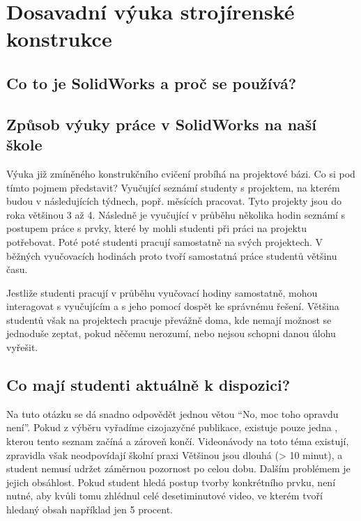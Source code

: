 \chapter{Dosavadní výuka strojírenské konstrukce}
\fxnote[inline=true]{\textcolor{mygreen}{Tato sekce je ještě částečně rozpracovaná, možná ji ještě přeformuluji celou}}

\section{Co to je SolidWorks a proč se používá?}

\section{Způsob výuky práce v SolidWorks na naší škole}
    Výuka již zmíněného konstrukčního cvičení probíhá na projektové bázi.
    Co si pod tímto pojmem představit?
    Vyučující seznámí studenty s projektem, na kterém budou v následujících týdnech, popř. měsících pracovat. 
    Tyto projekty jsou do roka většinou 3 až 4.
    Následně je vyučující v průběhu několika hodin seznámí s postupem práce s prvky, které by mohli studenti při práci na projektu potřebovat.
    Poté poté studenti pracují samostatně na svých projektech.
    V běžných vyučovacích hodinách proto tvoří samostatná práce studentů většinu času.

    Jestliže studenti pracují v průběhu vyučovací hodiny samostatně, mohou interagovat s vyučujícím a s jeho pomocí dospět ke správnému řešení.
    Většina studentů však na projektech pracuje převážně doma, kde nemají možnost se jednoduše zeptat, pokud něčemu nerozumí, nebo nejsou schopni danou úlohu vyřešit.

\section{Co mají studenti aktuálně k dispozici?}
    Na tuto otázku se dá snadno odpovědět jednou větou \enquote{No, moc toho opravdu není}.
    Pokud z výběru vyřadíme cizojazyčné publikace, existuje pouze jedna , kterou tento seznam začíná a zároveň končí. 
    Videonávody na toto téma existují, zpravidla však neodpovídají školní praxi
    Většinou jsou dlouhá (> 10 minut), a student nemusí udržet záměrnou pozornost po celou dobu.
    Dalším problémem je jejich obsáhlost.
    Pokud student hledá postup tvorby konkrétního prvku, není nutné, aby kvůli tomu zhlédnul celé desetiminutové video, ve kterém tvoří hledaný obsah například jen 5 procent. 
